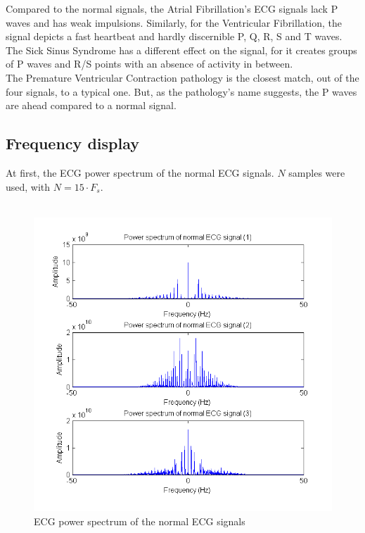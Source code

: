 \documentclass[11pt]{article}
\begin{document}
		Compared to the normal signals, the Atrial Fibrillation's ECG signals lack P waves and has weak impulsions. Similarly, for the Ventricular Fibrillation, the signal depicts a fast heartbeat and hardly discernible P, Q, R, S and T waves.\\
		The Sick Sinus Syndrome has a different effect on the signal, for it creates groups of P waves and R/S points with an absence of activity in between.\\
		The Premature Ventricular Contraction pathology is the closest match, out of the four signals, to a typical one. But, as the pathology's name suggests, the P waves are ahead compared to a normal signal.\\

	\subsection{Frequency display}
		At first, the ECG power spectrum of the normal ECG signals. $N$ samples were used, with $N = 15 \cdot F_s$.\\
		\\
		\begin{figure}[ht]
			\centering
			\includegraphics[scale=0.65]{images/Q321.png}
			\caption{ECG power spectrum of the normal ECG signals}
			\label{Q321}
		\end{figure}
\end{document}
